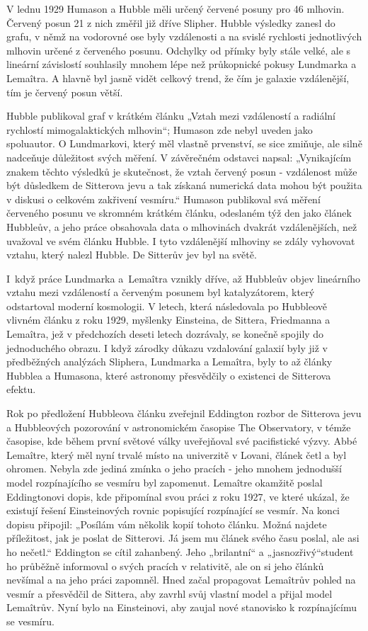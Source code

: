  V lednu 1929 Humason a Hubble měli určený červené posuny pro 46 mlhovin. Červený posun 21 z nich
  změřil již dříve Slipher. Hubble výsledky zanesl do grafu, v němž na vodorovné ose byly
  vzdálenosti a na svislé rychlosti jednotlivých mlhovin určené z červeného posunu. Odchylky od
  přímky byly stále velké, ale s lineární závislostí souhlasily mnohem lépe než průkopnické pokusy
  Lundmarka a Lemaîtra. A hlavně byl jasně vidět celkový trend, že čím je galaxie vzdálenější, tím
  je červený posun větší. 
  
  Hubble publikoval graf v krátkém článku „Vztah mezi vzdáleností a radiální rychlostí
  mimogalaktických mlhovin“; Humason zde nebyl uveden jako spoluautor. O Lundmarkovi, který měl
  vlastně prvenství, se sice zmiňuje, ale silně nadceňuje důležitost svých měření. V závěrečném
  odstavci napsal: „Vynikajícím znakem těchto výsledků je skutečnost, že vztah červený posun -
  vzdálenost může být důsledkem de Sitterova jevu a tak získaná numerická data mohou být použita v
  diskusi o celkovém zakřivení vesmíru.“ Humason publikoval svá měření červeného posunu ve skromném
  krátkém článku, odeslaném týž den jako článek Hubbleův, a jeho práce obsahovala data o mlhovinách
  dvakrát vzdálenějších, než uvažoval ve svém článku Hubble. I tyto vzdálenější mlhoviny se zdály
  vyhovovat vztahu, který nalezl Hubble. De Sitterův jev byl na světě. 
  
  I když práce Lundmarka a Lemaîtra vznikly dříve, až Hubbleův objev lineárního vztahu mezi
  vzdáleností a červeným posunem byl katalyzátorem, který odstartoval moderní kosmologii. V letech,
  která následovala po Hubbleově vlivném článku z roku 1929, myšlenky Einsteina, de Sittera,
  Friedmanna a Lemaîtra, jež v předchozích deseti letech dozrávaly, se konečně spojily do
  jednoduchého obrazu. I když zárodky důkazu vzdalování galaxií byly již v předběžných analýzách
  Sliphera, Lundmarka a Lemaîtra, byly to až články Hubblea a Humasona, které astronomy přesvědčily
  o existenci de Sitterova efektu. 
  
  Rok po předložení Hubbleova článku zveřejnil Eddington rozbor de Sitterova jevu a Hubbleových
  pozorování v astronomickém časopise The Observatory, v témže časopise, kde během první světové
  války uveřejňoval své pacifistické výzvy. Abbé Lemaître, který měl nyní trvalé místo na univerzitě
  v Lovani, článek četl a byl ohromen. Nebyla zde jediná zmínka o jeho pracích - jeho mnohem
  jednodušší model rozpínajícího se vesmíru byl zapomenut. Lemaître okamžitě poslal Eddingtonovi
  dopis, kde připomínal svou práci z roku 1927, ve které ukázal, že existují řešení Einsteinových
  rovnic popisující rozpínající se vesmír. Na konci dopisu připojil: „Posílám vám několik kopií
  tohoto článku. Možná najdete příležitost, jak je poslat de Sitterovi. Já jsem mu článek svého času
  poslal, ale asi ho nečetl.“ Eddington se cítil zahanbený. Jeho „brilantní“ a „jasnozřivý“student
  ho průběžně informoval o svých pracích v relativitě, ale on si jeho článků nevšímal a na jeho
  práci zapomněl. Hned začal propagovat Lemaîtrův pohled na vesmír a přesvědčil de Sittera, aby
  zavrhl svůj vlastní model a přijal model Lemaîtrův. Nyní bylo na Einsteinovi, aby zaujal nové
  stanovisko k rozpínajícímu se vesmíru. 
  
